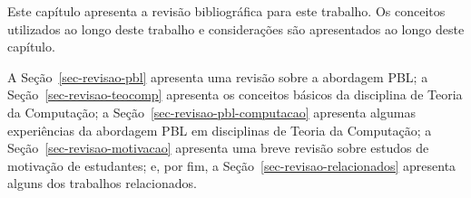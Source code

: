 \label{cap-revisao}
\acresetall

Este capítulo apresenta a revisão bibliográfica para este trabalho.
Os conceitos utilizados ao longo deste trabalho e considerações
são apresentados ao longo deste capítulo.

A Seção~\ref{sec-revisao-pbl} apresenta uma revisão sobre a abordagem \ac{PBL};
a Seção~\ref{sec-revisao-teocomp} apresenta os conceitos básicos da disciplina
de Teoria da Computação;
a Seção~\ref{sec-revisao-pbl-computacao} apresenta algumas experiências da
abordagem \ac{PBL} em disciplinas de Teoria da Computação;
a Seção~\ref{sec-revisao-motivacao} apresenta uma breve revisão sobre
estudos de motivação de estudantes;
e, por fim, a Seção~\ref{sec-revisao-relacionados} apresenta alguns dos trabalhos
relacionados.






